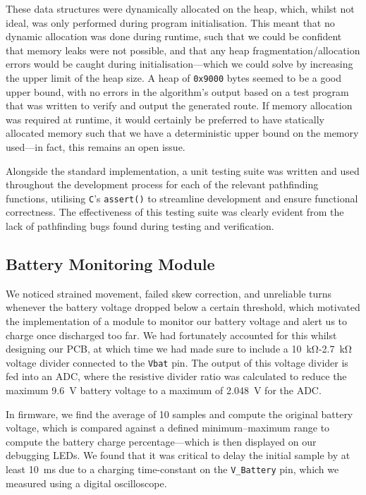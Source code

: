\documentclass[conference]{IEEEtran}
\begin{document}
These data structures were dynamically allocated on the heap, which, whilst not ideal, was only performed during program initialisation.
This meant that no dynamic allocation was done during runtime, such that we could be confident that memory leaks were not possible, and that any heap fragmentation/allocation errors would be caught during initialisation—which we could solve by increasing the upper limit of the heap size.
A heap of \texttt{0x9000} bytes seemed to be a good upper bound, with no errors in the algorithm's output based on a test program that was written to verify and output the generated route.
If memory allocation was required at runtime, it would certainly be preferred to have statically allocated memory such that we have a deterministic upper bound on the memory used—in fact, this remains an open issue.

Alongside the standard implementation, a unit testing suite was written and used throughout the development process for each of the relevant pathfinding functions, utilising \texttt{C}'s \texttt{assert()} to streamline development and ensure functional correctness.
The effectiveness of this testing suite was clearly evident from the lack of pathfinding bugs found during testing and verification.

\subsection{Battery Monitoring Module}

We noticed strained movement, failed skew correction, and unreliable turns whenever the battery voltage dropped below a certain threshold, which motivated the implementation of a module to monitor our battery voltage and alert us to charge once discharged too far.
We had fortunately accounted for this whilst designing our PCB, at which time we had made sure to include a \qty{10}{\kohm}-\qty{2.7}{\kohm} voltage divider connected to the \texttt{Vbat} pin.
The output of this voltage divider is fed into an ADC, where the resistive divider ratio was calculated to reduce the maximum \qty{9.6}{\volt} battery voltage to a maximum of \qty{2.048}{\volt} for the ADC.

In firmware, we find the average of 10 samples and compute the original battery voltage, which is compared against a defined minimum–maximum range to compute the battery charge percentage—which is then displayed on our debugging LEDs.
We found that it was critical to delay the initial sample by at least \qty{10}{\ms} due to a charging time-constant on the \texttt{V\_Battery} pin, which we measured using a digital oscilloscope.
\end{document}
